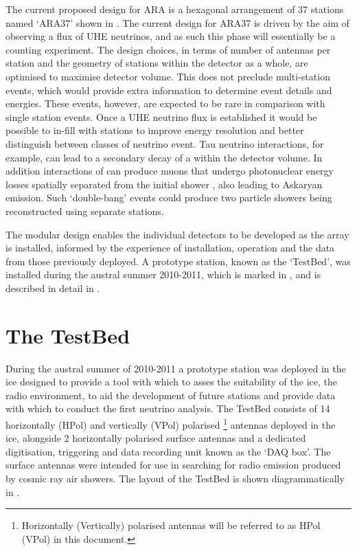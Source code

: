 The current proposed design for ARA is a hexagonal arrangement of 37 stations named `ARA37' shown in . The current design for ARA37 is driven by the aim of observing a flux of UHE neutrinos, and as such this phase will essentially be a counting experiment. The design choices, in terms of number of antennas per station and the geometry of stations within the detector as a whole, are optimised to maximise detector volume. This does not preclude multi-station events, which would provide extra information to determine event details and energies. These events, however, are expected to be rare in comparison with single station events. Once a UHE neutrino flux is established it would be possible to in-fill with stations to improve energy resolution and better distinguish between classes of neutrino event. Tau neutrino interactions, for example, can lead to a secondary decay of a \Ptau within the detector volume. In addition interactions of \Pnum can produce muons that undergo photonuclear energy losses spatially separated from the initial shower \cite{MercurioThesis}, also leading to Askaryan emission. Such `double-bang' events could produce two particle showers being reconstructed using separate stations.


The modular design enables the individual detectors to be developed as the array is installed, informed by the experience of installation, operation and the data from those previously deployed. A prototype station, known as the `TestBed', was installed during the austral summer 2010-2011, which is marked in , and is described in detail in . 



\section{The TestBed}
\label{sec:ara-detector:TestBed}

During the austral summer of 2010-2011 a prototype station was deployed in the ice designed to provide a tool with which to asses the suitability of the ice, the radio environment, to aid the development of future stations and provide data with which to conduct the first neutrino analysis. The TestBed consists of 14 horizontally (HPol) and vertically (VPol) polarised \footnote{Horizontally (Vertically) polarised antennas will be referred to as HPol (VPol) in this document.} antennas deployed in the ice, alongside 2 horizontally polarised surface antennas and a dedicated digitisation, triggering and data recording unit known as the `DAQ box'. The surface antennas were intended for use in searching for radio emission produced by cosmic ray air showers. The layout of the TestBed is shown diagrammatically in .

